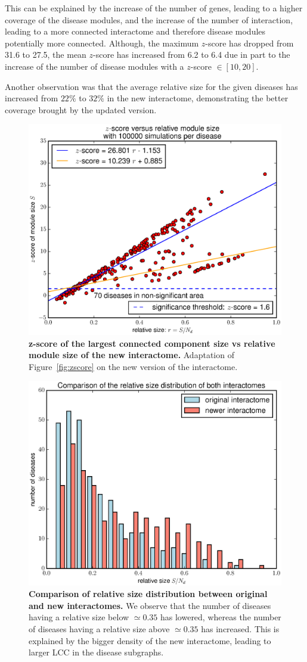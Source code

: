 \documentclass[letterpaper]{article}
\begin{document}
	This can be explained by the increase of the number of genes, leading to a higher coverage of the disease
	modules, and the increase of the number of interaction, leading to a more connected interactome and
	therefore disease modules potentially more connected. Although, the maximum $z$-score has dropped from
	31.6 to 27.5, the mean $z$-score has increased from 6.2 to 6.4 due in part to the increase of the number
	of disease modules with a $z$-score $\in [10, 20]$.

	Another observation was that the average relative size for the given diseases has increased from $22\%$
	to $32\%$ in the new interactome, demonstrating the better coverage brought by the updated version.

	\begin{figure}[!h]
		\hspace{-.6cm}
		\includegraphics[width=.55\textwidth]{images/new_interactome_S4.b100000.eps}
		\vspace{-.7cm}
		\caption{{\bf z-score of the largest connected component size vs relative module size of the new interactome.}
		Adaptation of Figure~\ref{fig:zscore} on the new version of the interactome.
		\label{fig:new interactome zscore}}
	\end{figure}

	\begin{figure}[!h]
		\hspace{-.6cm}
		\includegraphics[width=.55\textwidth]{images/rel_sizes_comparison.eps}
		\vspace{-.5cm}
		\caption{{\bf Comparison of relative size distribution between original and new interactomes.}
		We observe that the number of diseases having a relative size below $\simeq 0.35$ has lowered, whereas the number
		of diseases having a relative size above $\simeq 0.35$ has increased. This is explained by the bigger density of
		the new interactome, leading to larger LCC in the disease subgraphs.
		\label{fig:rel sizes comparison}}
		\vspace{-.7cm}
	\end{figure}
\end{document}
